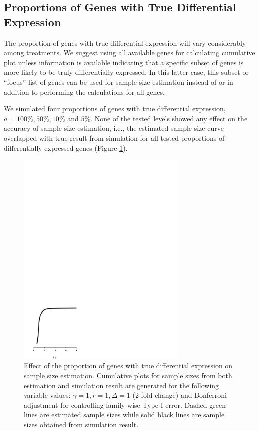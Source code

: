 \documentclass{bioinfo}
\begin{document}
\subsection{Proportions of Genes with True Differential Expression}

The proportion of genes with true differential expression will vary
considerably among treatments. We suggest using all available genes
for calculating cumulative plot unless information is available
indicating that a specific subset of genes is more likely to be
truly differentially expressed. In this latter case, this subset or
``focus'' list of genes can be used for sample size estimation
instead of or in addition to performing the calculations for all
genes.

We simulated four proportions of genes with true differential
expression, $a = 100\%, 50\%, 10\%$ and $5\%$. None of the tested
levels showed any effect on the accuracy of sample size
estimation, i.e., the estimated sample size curve overlapped with
true result from simulation for all tested proportions of
differentially expressed genes (Figure \ref{fig:ResAlt}).

\begin{figure}[h]
  \centerline{\includegraphics*[width=3.2in]{ResAlt.pdf}}
  \caption[Effect of the proportion of genes with true differential
    expression on sample size estimation] {Effect of the proportion of
    genes with true differential expression on sample size estimation.
    Cumulative plots for sample sizes from both estimation and
    simulation result are generated for the following variable values:
    $\gamma = 1, r = 1, \Delta = 1$ (2-fold change) and Bonferroni
    adjustment for controlling family-wise Type I error. Dashed green
    lines are estimated sample sizes while solid black lines are
    sample sizes obtained from simulation result.}
  \label{fig:ResAlt}
\end{figure}
\end{document}
